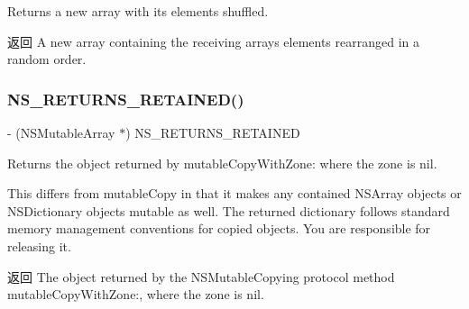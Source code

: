 Returns a new array with its elements shuffled.

\begin{DoxyReturn}{返回}
A new array containing the receiving array\textquotesingle{}s elements rearranged in a random order. 
\end{DoxyReturn}
\mbox{\label{category_n_s_array_07_m_a_r_e_x_08_a99e0c3c24e69dd49e3f9b3fe8b207f8e}} 
\subsubsection{\texorpdfstring{N\+S\+\_\+\+R\+E\+T\+U\+R\+N\+S\+\_\+\+R\+E\+T\+A\+I\+N\+E\+D()}{NS\_RETURNS\_RETAINED()}}
{\footnotesize\ttfamily -\/ (N\+S\+Mutable\+Array $\ast$) N\+S\+\_\+\+R\+E\+T\+U\+R\+N\+S\+\_\+\+R\+E\+T\+A\+I\+N\+ED \begin{DoxyParamCaption}{ }\end{DoxyParamCaption}}

Returns the object returned by {\ttfamily mutable\+Copy\+With\+Zone\+:} where the zone is {\ttfamily nil}.

This differs from {\ttfamily mutable\+Copy} in that it makes any contained {\ttfamily N\+S\+Array} objects or {\ttfamily N\+S\+Dictionary} objects mutable as well. The returned dictionary follows standard memory management conventions for copied objects. You are responsible for releasing it.

\begin{DoxyReturn}{返回}
The object returned by the {\ttfamily N\+S\+Mutable\+Copying} protocol method {\ttfamily mutable\+Copy\+With\+Zone\+:}, where the zone is {\ttfamily nil}. 
\end{DoxyReturn}
\mbox{\label{category_n_s_array_07_m_a_r_e_x_08_af4f85cca4e9b7f35f80b67ba2e17f650}} 
